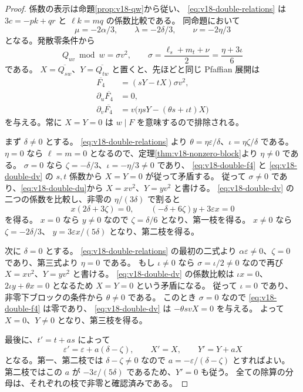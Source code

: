 \documentclass[11pt,a4paper]{ltjsarticle}
\theoremstyle{remark}\newtheorem{remark}[theorem]{注意}
\begin{document}
\begin{proof}
係数の表示は命題\ref{prop:v18-qw}から従い、
\eqref{eq:v18-double-relations} は $3c=-pk+qr$ と $\ell k=mq$ の係数比較である。
同命題において
\[
             \mu=-2\alpha/3,\qquad
             \lambda=-2\delta/3,\qquad
             \nu=-2\eta/3
\]
となる。発散零条件から
\[
 Q_{uv}\bmod w=\sigma v^2,
 \qquad \sigma=\frac{\ell_s+m_t+\nu}{2}
              =\frac{\eta+3\iota}{6}
\]
である。
$X=\overline{Q_{sw}}$、$Y=\overline{Q_{tw}}$ と置くと、先ほどと同じ Pfaffian 展開は
\begin{align}
 \overline{F_4}&=(sY-tX)\sigma v^2,\label{eq:v18-double-f4}\\
 \partial_u\overline{F_4}&=0,\label{eq:v18-double-du}\\
 \partial_v\overline{F_4}&=v\bigl(\eta sY-(\theta s+\iota t)X\bigr)
 \label{eq:v18-double-dv}
\end{align}
を与える。常に $X=Y=0$ は $w\mid F$ を意味するので排除される。

まず $\delta\ne0$ とする。
\eqref{eq:v18-double-relations} より
$\theta=\eta\varepsilon/\delta$、$\iota=\eta\zeta/\delta$ である。
$\eta=0$ なら $\ell=m=0$ となるので、定理\ref{thm:v18-nonzero-block}より $\eta\ne0$ である。
$\sigma=0$ なら $\zeta=-\delta/3$、$\iota=-\eta/3\ne0$ であり、
\eqref{eq:v18-double-f4} と \eqref{eq:v18-double-dv} の $s,t$ 係数から
$X=Y=0$ が従って矛盾する。
従って $\sigma\ne0$ であり、\eqref{eq:v18-double-du}から
$X=xv^2$、$Y=yv^2$ と書ける。
\eqref{eq:v18-double-dv} の二つの係数を比較し、非零の $\eta/(3\delta)$ で割ると
\begin{equation}\label{eq:v18-double-xy}
          x(2\delta+3\zeta)=0,\qquad
          (-\delta+6\zeta)y+3\varepsilon x=0
\end{equation}
を得る。
$x=0$ なら $y\ne0$ なので $\zeta=\delta/6$ となり、第一枝を得る。
$x\ne0$ なら $\zeta=-2\delta/3$、
$y=3\varepsilon x/(5\delta)$ となり、第二枝を得る。

次に $\delta=0$ とする。
\eqref{eq:v18-double-relations} の最初の二式より
$\alpha\varepsilon\ne0$、$\zeta=0$ であり、第三式より $\eta=0$ である。
もし $\iota\ne0$ なら $\sigma=\iota/2\ne0$ なので再び
$X=xv^2$、$Y=yv^2$ と書ける。
\eqref{eq:v18-double-dv} の係数比較は
$\iota x=0$、$2\iota y+\theta x=0$ となるため $X=Y=0$ という矛盾になる。
従って $\iota=0$ であり、非零下ブロックの条件から $\theta\ne0$ である。
このとき $\sigma=0$ なので \eqref{eq:v18-double-f4} は零であり、
\eqref{eq:v18-double-dv} は $-\theta svX=0$ を与える。
よって $X=0$、$Y\ne0$ となり、第三枝を得る。

最後に、$t'=t+as$ によって
\[
 \varepsilon'=\varepsilon+a(\delta-\zeta),
 \qquad X'=X,\qquad Y'=Y+aX
\]
となる。第一、第二枝では $\delta-\zeta\ne0$ なので
$a=-\varepsilon/(\delta-\zeta)$ とすればよい。
第二枝ではこの $a$ が $-3\varepsilon/(5\delta)$ であるため、$Y'=0$ も従う。
全ての除算の分母は、それぞれの枝で非零と確認済みである。
\end{proof}
\end{document}
